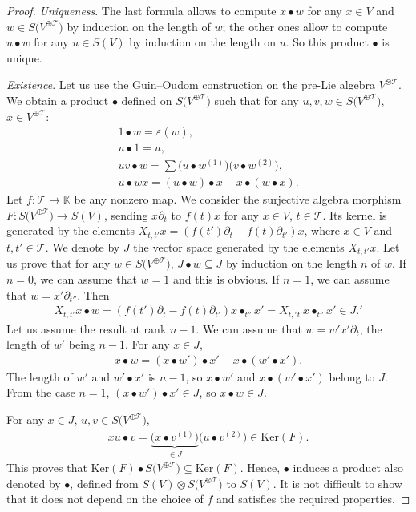 \documentclass[11pt]{article}
\numberwithin{equation}{section}
\numberwithin{equation}{section}
\newcommand{\K}{\mathbb{K}}
\newcommand{\T}{\mathcal{T}}
\renewcommand{\ker}{\mathrm{Ker}}
\begin{document}
\begin{proof} \textit{Uniqueness}. The last formula allows to compute $x\bullet w$ for any $x\in V$
and $w\in S\big(V^{\oplus\T}\big)$ by induction on the length of $w$;
the other ones allow to compute $u\bullet w$ for any $u\in S(V)$ by induction on the length on $u$.
So this product $\bullet$ is unique.

\textit{Existence}. Let us use the Guin--Oudom construction \cite{Guin1,Guin2} on the pre-Lie algebra $V^{\otimes \T}$.
We obtain a product $\bullet$
defined on $S\big(V^{\oplus\T}\big)$ such that for any $u,v,w\in S\big(V^{\oplus\T}\big)$, $x\in V^{\oplus \T}$:
\begin{gather*}
1\bullet w=\varepsilon(w),
\\
u\bullet 1=u,
\\
uv\bullet w=\sum \big(u\bullet w^{(1)}\big)\big(v\bullet w^{(2)}\big),
\\
u\bullet w x=(u\bullet w)\bullet x-x\bullet (w\bullet x).
\end{gather*}
Let $f\colon \T\longrightarrow \K$ be any nonzero map. We consider the surjective algebra morphism
$F\colon S\big(V^{\oplus\T}\big)\allowbreak\longrightarrow S(V)$,
sending $x\partial_t$ to $f(t)x$ for any $x\in V$, $t\in \T$. Its kernel is generated by the elements
$X_{t,t'}x=(f(t')\partial_t-f(t)\partial_{t'})x$,
where $x\in V$ and $t,t'\in \T$. We denote by $J$ the vector space generated by the elements $X_{t,t'}x$.
Let us prove that for any $w\in S\big(V^{\oplus\T}\big)$, $J\bullet w\subseteq J$ by induction on the length $n$ of $w$.
If $n=0$, we can assume that $w=1$ and this is obvious. If $n=1$, we can assume that $w=x'\partial_{t''}$. Then
\begin{gather*}
X_{t,t'}x\bullet w=(f(t')\partial_t-f(t)\partial_{t'}) x\bullet_{t''} x'
=X_{t,'t'}x\bullet_{t''} x' \in J.'
\end{gather*}
Let us assume the result at rank $n-1$. We can assume that $w=w' x'\partial_t$, the length of $w'$ being $n-1$.
For any $x\in J$,
\begin{gather*}
x\bullet w=(x\bullet w')\bullet x'-x\bullet(w'\bullet x').
\end{gather*}
The length of $w'$ and $w'\bullet x'$ is $n-1$, so $x\bullet w'$ and $x\bullet (w'\bullet x')$ belong to $J$.
From the case $n=1$,
$(x\bullet w')\bullet x'\in J$, so $x\bullet w\in J$.

For any $x\in J$, $u,v\in S\big(V^{\oplus\T}\big)$,
\begin{gather*}
xu\bullet v=\underbrace{\big(x\bullet v^{(1)}\big)}_{\in J} \big(u\bullet v^{(2)}\big) \in \ker(F).
\end{gather*}
This proves that $\ker(F)\bullet S\big(V^{\oplus\T}\big)\subseteq \ker(F)$. Hence, $\bullet$ induces a product also denoted by $\bullet$,
defined from $S(V)\otimes S\big(V^{\otimes \T}\big)$ to $S(V)$. It is not difficult to show that it does not depend on the choice of $f$
and satisfies the required properties.
\end{proof}
\end{document}
